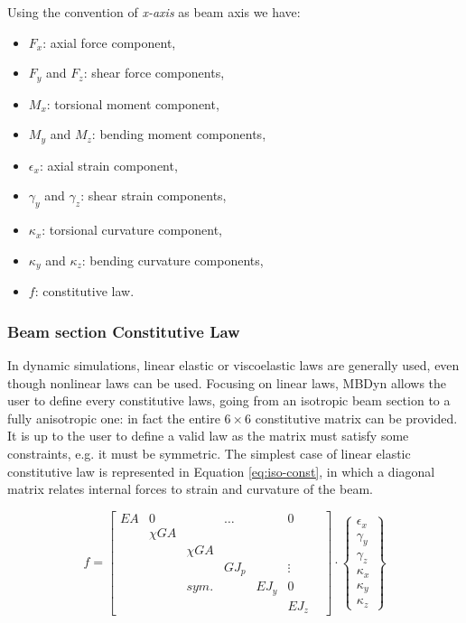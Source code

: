Using the convention of \textit{x-axis} as beam axis we have:

\begin{itemize}
	\item $F_x$: axial force component,
	\item $F_y$ and $F_z$: shear force components,
	\item $M_x$: torsional moment component,
	\item $M_y$ and $M_z$: bending moment components,
	\item $\epsilon_x$: axial strain component,
	\item $\gamma_y$ and $\gamma_z$: shear strain components,
	\item $\kappa_x$: torsional curvature component,
	\item $\kappa_y$ and $\kappa_z$: bending curvature components,
	\item $f$: constitutive law.
\end{itemize}


\subsubsection{Beam section Constitutive Law}

In dynamic simulations, linear elastic or viscoelastic laws are generally used, even though nonlinear laws can be used.  Focusing on linear laws, MBDyn allows the user to define every constitutive laws, going from an isotropic beam section to a fully anisotropic one: in fact the entire $6 \times 6$ constitutive matrix can be provided. It is up to the user to define a valid law as the matrix must satisfy some constraints, e.g. it must be symmetric. The simplest case of linear elastic constitutive law is represented in Equation \ref{eq:iso-const}, in which a diagonal matrix relates internal forces to strain and curvature of the beam. 

\begin{equation}
    f = \begin{bmatrix} EA & 0 & & \ldots &  & 0 \\
                          & \chi GA &  & & & &  \\
                          & & \chi GA & & & \\
                          & & & GJ_p & & \vdots \\
                          & &  sym. & & EJ_y & 0 \\
                          & & & & & EJ_z
    \end{bmatrix} \cdot 
    \begin{Bmatrix}
		\epsilon_x \\ \gamma_y \\ \gamma_z \\ \kappa_x \\ \kappa_y \\ \kappa_z
	\end{Bmatrix}
    \label{eq:iso-const}
\end{equation}

